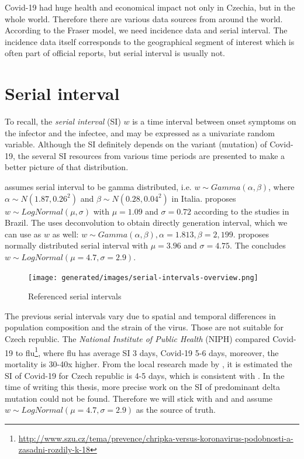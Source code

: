 \documentclass[
  digital, %
  oneside, %
  lof,     %
  lot,     %
]{fithesis4}
\begin{document}
Covid-19 had huge health and economical impact not only in 
Czechia, but in the whole world. 
Therefore there are various data sources from around the world. 
According to the Fraser model, we need incidence data and 
serial interval.
The incidence data itself corresponds to the geographical 
segment of interest which is often part of official reports, 
but serial interval is usually not.


\section{Serial interval}

To recall, the \textit{serial interval} (SI) $w$ is a time 
interval between onset symptoms on the infector and the 
infectee, and may be expressed as a univariate random variable. 
Although the SI definitely depends on the variant (mutation) of 
Covid-19, the several SI resources from various time periods are 
presented to make a better picture of that distribution.

\cite{simone2020} assumes serial interval to be gamma 
distributed, i.e. $w \sim Gamma(\alpha,\beta)$, where 
$\alpha \sim N \left( 1.87, 0.26^2 \right)$ and 
$\beta \sim N \left( 0.28, 0.04^2 \right)$ in Italia. 
\cite{prete2020} proposes $w \sim LogNormal(\mu, \sigma)$ 
with $\mu = 1.09$ and $\sigma = 0.72$ according to the 
studies in Brazil. The \cite{knight2020} uses deconvolution 
to obtain directly generation interval, which we can use 
as $w$ as well: $w \sim Gamma(\alpha, \beta), \alpha = 1.813, \beta = 2,199$.
\cite{du2020} proposes normally distributed serial 
interval with $\mu = 3.96$ and $\sigma = 4.75$. 
The \cite{nishiura2020} concludes 
$w \sim LogNormal \left( \mu = 4.7, \sigma = 2.9 \right)$.

\begin{figure}[h]
  \begin{center}
    \texttt{[image: generated/images/serial-intervals-overview.png]}
  \end{center}
  \caption{Referenced serial intervals}
  \label{fig:serial-intervals-overview}
\end{figure}

The previous serial intervals vary due to spatial and 
temporal differences in population composition and the
strain of the virus.
Those are not suitable for Czech republic. 
The \textit{National Institute of Public Health} (NIPH)  
compared Covid-19 to flu\footnote{\url{http://www.szu.cz/tema/prevence/chripka-versus-koronavirus-podobnosti-a-zasadni-rozdily-k-18}}, 
where flu has average SI 3 days, 
Covid-19 5-6 days, moreover, the mortality is 30-40x higher.
From the local research made by \cite{majek2020}, 
it is estimated the SI of Covid-19 for Czech republic is 4-5 days, which is 
consistent with \cite{nishiura2020}. 
In the time of writing this thesis, more precise work on the 
SI of predominant delta mutation could not be found. 
Therefore we will stick with \cite{majek2020} and 
\cite{nishiura2020} and assume 
$w \sim LogNormal \left( \mu = 4.7, \sigma = 2.9 \right)$ 
as the source of truth. 
\end{document}
